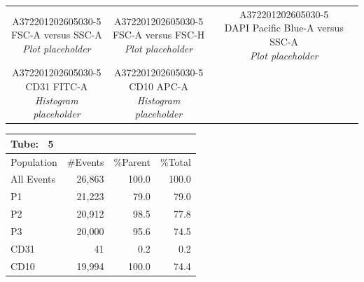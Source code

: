\documentclass[UTF8,10pt,a4paper,fontset=fandol]{ctexart}
\begin{document}
\begin{center}
\begin{tabular}{ccc}
\fbox{\parbox[c][3.1cm][c]{0.29\linewidth}{\centering
A372201202605030-5\\
FSC-A versus SSC-A\\
\textit{Plot placeholder}}}
&
\fbox{\parbox[c][3.1cm][c]{0.29\linewidth}{\centering
A372201202605030-5\\
FSC-A versus FSC-H\\
\textit{Plot placeholder}}}
&
\fbox{\parbox[c][3.1cm][c]{0.29\linewidth}{\centering
A372201202605030-5\\
DAPI Pacific Blue-A versus SSC-A\\
\textit{Plot placeholder}}}
\\[0.5em]
\fbox{\parbox[c][3.1cm][c]{0.29\linewidth}{\centering
A372201202605030-5\\
CD31 FITC-A\\
\textit{Histogram placeholder}}}
&
\fbox{\parbox[c][3.1cm][c]{0.29\linewidth}{\centering
A372201202605030-5\\
CD10 APC-A\\
\textit{Histogram placeholder}}}
&
\\
\end{tabular}
\end{center}

\begin{center}
\small
\begin{tabular}{|l|r|r|r|}
\hline
\multicolumn{4}{|l|}{\textbf{Tube: \ 5}}\\
\hline
Population & \#Events & \%Parent & \%Total\\
\hline
All Events & 26,863 & 100.0 & 100.0\\
\quad P1 & 21,223 & 79.0 & 79.0\\
\quad P2 & 20,912 & 98.5 & 77.8\\
\quad P3 & 20,000 & 95.6 & 74.5\\
\quad CD31 & 41 & 0.2 & 0.2\\
\quad CD10 & 19,994 & 100.0 & 74.4\\
\hline
\end{tabular}
\end{center}
\end{document}
